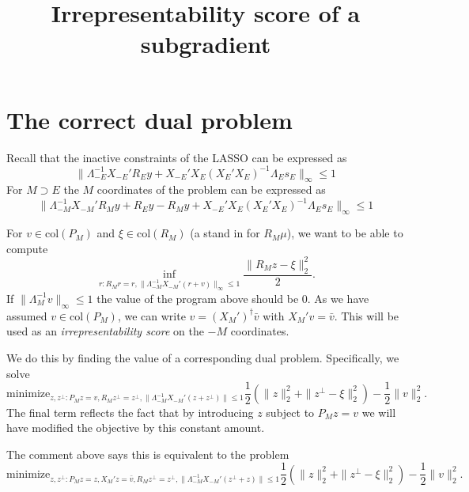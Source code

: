 \documentclass{article}
\title{ {\bf Irrepresentability score of a subgradient}}
\author{}
\begin{document}
	\maketitle \RaggedRight

        
        \section{The correct dual problem}

       Recall that the inactive constraints of the
          LASSO can be expressed as
          \begin{equation}
            \label{eq:inactive}
            \|\Lambda_{-E}^{-1}X_{-E}'R_Ey + X_{-E}'X_E(X_E'X_E)^{-1}\Lambda_Es_E\|_{\infty}
            \leq 1
            \end{equation}
          For $M \supset E$ the $M$ coordinates of the problem can be expressed as
          \begin{equation}
            \label{eq:inactive}
            \|\Lambda_{-M}^{-1}X_{-M}'R_My + R_Ey-R_My + X_{-E}'X_E(X_E'X_E)^{-1}\Lambda_Es_E\|_{\infty}
            \leq 1
            \end{equation}
          
          For $v \in \text{col}(P_M)$ and $\xi \in \text{col}(R_M)$ (a stand in for $R_M\mu$), we want to be able to compute
          \begin{equation}
            \label{eq:LD}
          \inf_{r: R_Mr=r,  \|\Lambda_{-M}^{-1}X_{-M}'(r + v)\|_{\infty}
            \leq 1} \frac{\|R_Mz - \xi\|^2_2}{2}.
          \end{equation}
          If $\|\Lambda_M^{-1}v\|_{\infty} \leq 1$ the value of the program above should be 0.
          As we have assumed $v \in \text{col}(P_M)$, we can write $v=(X_M')^{\dagger}\bar{v}$ with $X_M'v=\bar{v}$.
          This will be used as an {\em irrepresentability score} on the $-M$ coordinates.

          We do this by finding the value of a corresponding dual problem. Specifically, we solve
          $$
          \text{minimize}_{z,z^{\perp}: P_Mz=v, R_Mz^{\perp}=z^{\perp}, \|\Lambda_{-M}^{-1}X_{-M}'(z+z^{\perp})\| \leq 1} \frac{1}{2} \left(\|z\|^2_2 + \|z^{\perp}-\xi\|^2_2 \right) - \frac{1}{2} \|v\|^2_2.
          $$
          The final term reflects the fact that by introducing $z$ subject to $P_Mz=v$ we will have modified
          the objective by this constant amount.
          
          The comment above says this is equivalent to the problem
          $$
          \text{minimize}_{z,z^{\perp}: P_Mz=z, X_M'z=\bar{v}, R_Mz^{\perp}=z^{\perp}, \|\Lambda_{-M}^{-1}X_{-M}'(z^{\perp}+z)\| \leq 1} \frac{1}{2} \left(\|z\|^2_2 + \|z^{\perp}-\xi\|^2_2 \right) - \frac{1}{2} \|v\|^2_2.
          $$
          
\end{document}
